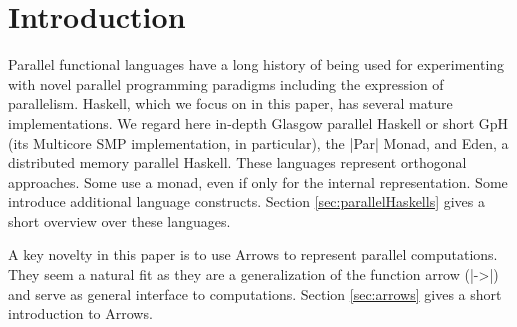 
\section{Introduction}
\label{sec:introduction}
%
%
%

Parallel functional languages have a long history of being used for experimenting with novel parallel programming paradigms including the expression of parallelism. Haskell, which we focus on in this paper, has  several mature implementations. We regard here in-depth
Glasgow parallel Haskell or short GpH (its Multicore SMP implementation, in particular), the
|Par| Monad, and Eden, a distributed memory parallel Haskell. These
languages represent orthogonal approaches. Some use a monad, even if
only for the internal representation. Some introduce additional
language constructs. Section \ref{sec:parallelHaskells} gives a short overview over these languages.

A key novelty in this paper is to use Arrows to represent parallel computations. They seem a natural fit as they are a generalization of the function arrow (|->|) and serve as general interface to computations. Section \ref{sec:arrows} gives a short introduction to Arrows.

